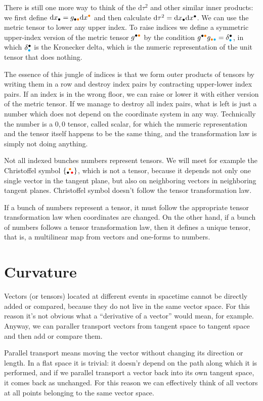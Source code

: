 \documentclass[11pt,oneside%
]{memoir}
\newcommand{\dd}{\mathrm{d}}
\newcommand{\chris}[3]{\{{_{#1}}\!{^{#2}}\!{_{#3}}\}}
\newcommand{\coa}{{\color{black}\bullet}}
\newcommand{\cob}{{\color{oranssi}\bullet}}
\newcommand{\coc}{{\color{cyan}\bullet}}
\newcommand{\cod}{{\color{red}\bullet}}
\begin{document}
There is still one more way to think of the \(\dd\tau^2\) and other similar inner products: we first define \(\dd x_\coa=g_{\coa\cob}\dd x^\cob\) and then calculate \(\dd\tau^2=\dd x_\coa\dd x^\coa\). We can use the metric tensor to lower any upper index. To raise indices we define a symmetric upper-index version of the metric tensor \(g^{\coa\cob}\) by the condition \(g^{\coa\cob}g_{\cob\coc}=\delta^{\coa}_{\coc}\), in which \(\delta^{\coa}_{\coc}\) is the Kronecker delta, which is the numeric representation of the unit tensor that does nothing. 

The essence of this jungle of indices is that we form outer products of tensors by writing them in a row and destroy index pairs by contracting upper-lower index pairs. If an index is in the wrong floor, we can raise or lower it with either version of the metric tensor. If we manage to destroy all index pairs, what is left is just a number which does not depend on the coordinate system in any way. Technically the number is a \(0,0\) tensor, called scalar, for which the numeric representation and the tensor itself happens to be the same thing, and the transformation law is simply not doing anything.

Not all indexed bunches numbers represent tensors. We will meet for example the Christoffel symbol \(\chris{\coa}{\cob}{\cod}\), which is not a tensor, because it depends not only one single vector in the tangent plane, but also on neighboring vectors in neighboring tangent planes. Christoffel symbol doesn't follow the tensor transformation law.

If a bunch of numbers represent a tensor, it must follow the appropriate tensor transformation law when coordinates are changed. On the other hand, if a bunch of numbers follows a tensor transformation law, then it defines a unique tensor, that is, a multilinear map from vectors and one-forms to numbers.

\section{Curvature}

Vectors (or tensors) located at different events in spacetime cannot be directly added or compared, because they do not live in the same vector space. For this reason it's not obvious what a ``derivative of a vector'' would mean, for example. Anyway, we can paraller transport vectors from tangent space to tangent space and then add or compare them.

Parallel transport means moving the vector without changing its direction or length. In a flat space it is trivial: it doesn'r depend on the path along which it is performed, and if we parallel transport a vector back into its own tangent space, it comes back as unchanged. For this reason we can effectively think of all vectors at all points belonging to the same vector space.
\end{document}
